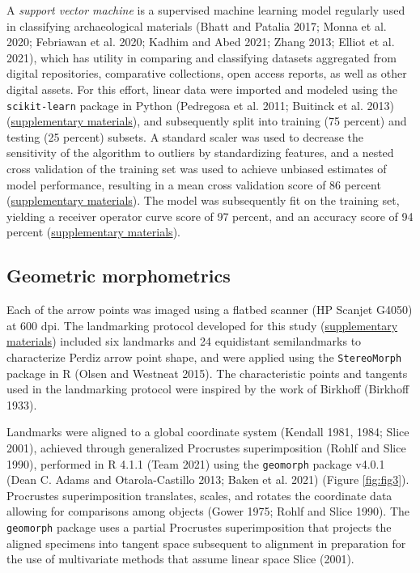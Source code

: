 \documentclass[smallextended]{svjour3}       %
\begin{document}
A \emph{support vector machine} is a supervised machine learning model
regularly used in classifying archaeological materials (Bhatt and
Patalia 2017; Monna et al. 2020; Febriawan et al. 2020; Kadhim and Abed
2021; Zhang 2013; Elliot et al. 2021), which has utility in comparing
and classifying datasets aggregated from digital repositories,
comparative collections, open access reports, as well as other digital
assets. For this effort, linear data were imported and modeled using the
\texttt{scikit-learn} package in Python (Pedregosa et al. 2011; Buitinck
et al. 2013) (\href{https://seldenlab.github.io/perdiz3/}{supplementary
materials}), and subsequently split into training (75 percent) and
testing (25 percent) subsets. A standard scaler was used to decrease the
sensitivity of the algorithm to outliers by standardizing features, and
a nested cross validation of the training set was used to achieve
unbiased estimates of model performance, resulting in a mean cross
validation score of 86 percent
(\href{https://seldenlab.github.io/perdiz3/}{supplementary materials}).
The model was subsequently fit on the training set, yielding a receiver
operator curve score of 97 percent, and an accuracy score of 94 percent
(\href{https://seldenlab.github.io/perdiz3/}{supplementary materials}).

\hypertarget{geometric-morphometrics}{%
\subsection{Geometric morphometrics}\label{geometric-morphometrics}}

Each of the arrow points was imaged using a flatbed scanner (HP Scanjet
G4050) at 600 dpi. The landmarking protocol developed for this study
(\href{https://seldenlab.github.io/perdiz3/}{supplementary materials})
included six landmarks and 24 equidistant semilandmarks to characterize
Perdiz arrow point shape, and were applied using the
\texttt{StereoMorph} package in R (Olsen and Westneat 2015). The
characteristic points and tangents used in the landmarking protocol were
inspired by the work of Birkhoff (Birkhoff 1933).

Landmarks were aligned to a global coordinate system (Kendall 1981,
1984; Slice 2001), achieved through generalized Procrustes
superimposition (Rohlf and Slice 1990), performed in R 4.1.1 (Team 2021)
using the \texttt{geomorph} package v4.0.1 (Dean C. Adams and
Otarola-Castillo 2013; Baken et al. 2021) (Figure \ref{fig:fig3}).
Procrustes superimposition translates, scales, and rotates the
coordinate data allowing for comparisons among objects (Gower 1975;
Rohlf and Slice 1990). The \texttt{geomorph} package uses a partial
Procrustes superimposition that projects the aligned specimens into
tangent space subsequent to alignment in preparation for the use of
multivariate methods that assume linear space Slice (2001).
\end{document}
